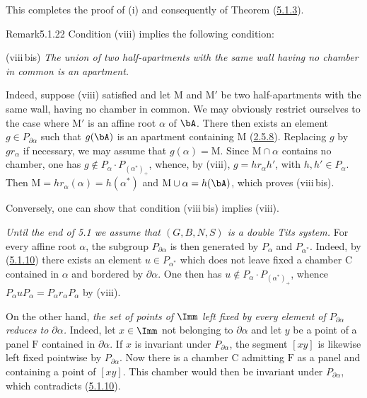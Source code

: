 \documentclass[12pt,a4paper,oneside,english]{smfart}
\makeatletter
\newcommand{\btanchor}[1]{\leavevmode\Hy@raisedlink{\hypertarget{bt:#1}{}}}
\newcommand{\btref}[1]{\hyperlink{bt:#1}{#1}}
\theoremstyle{definition}
\theoremstyle{bt}
\makeatother
\begin{document}
This completes the proof of (i) and consequently of Theorem (\btref{5.1.3}).

\begin{btstat}{Remark}{5.1.22}\btanchor{5.1.22}
\upshape
Condition (viii) implies the following condition:

\medskip
\noindent
(viii\,bis) \emph{The union of two half-apartments with the same wall having no
chamber in common is an apartment.}

\medskip
Indeed, suppose (viii) satisfied and let $\mathrm{M}$ and $\mathrm{M}'$ be two
half-apartments with the same wall, having no chamber in common. We may
obviously restrict ourselves to the case where $\mathrm{M}'$ is an affine root
$\alpha$ of $\bA$. There then exists an element $g\in P_{\partial\alpha}$ such
that $g(\bA)$ is an apartment containing $\mathrm{M}$ (\btref{2.5.8}). Replacing $g$ by
$gr_{\alpha}$ if necessary, we may assume that $g(\alpha)=\mathrm{M}$. Since
$\mathrm{M}\cap\alpha$ contains no chamber, one has
$g\notin P_{\alpha}\cdot P_{(\alpha^{*})_{+}}$, whence, by (viii),
$g=hr_{\alpha}h'$, with $h,h'\in P_{\alpha}$. Then
$\mathrm{M}=hr_{\alpha}(\alpha)=h(\alpha^{*})$ and
$\mathrm{M}\cup\alpha=h(\bA)$, which proves (viii\,bis).

Conversely, one can show that condition (viii\,bis) implies (viii).
\end{btstat}

\btanchor{5.1.23}
\emph{Until the end of \textup{5.1} we assume that $(G,B,N,S)$ is a double Tits
system.} For every affine root $\alpha$, the subgroup $P_{\partial\alpha}$ is
then generated by $P_{\alpha}$ and $P_{\alpha^{*}}$. Indeed, by (\btref{5.1.10}) there
exists an element $u\in P_{\alpha^{*}}$ which does not leave fixed a chamber
$\mathrm{C}$ contained in $\alpha$ and bordered by $\partial\alpha$. One then
has $u\notin P_{\alpha}\cdot P_{(\alpha^{*})_{+}}$, whence
$P_{\alpha}uP_{\alpha}=P_{\alpha}r_{\alpha}P_{\alpha}$ by (viii).

On the other hand, \emph{the set of points of $\Imm$ left fixed by every element
of $P_{\partial\alpha}$ reduces to $\partial\alpha$.} Indeed, let
$x\in\Imm$ not belonging to $\partial\alpha$ and let $y$ be a point of a panel
$\mathrm{F}$ contained in $\partial\alpha$. If $x$ is invariant under
$P_{\partial\alpha}$, the segment $[xy]$ is likewise left fixed pointwise by
$P_{\partial\alpha}$. Now there is a chamber $\mathrm{C}$ admitting $\mathrm{F}$
as a panel and containing a point of $[xy]$. This chamber would then be
invariant under $P_{\partial\alpha}$, which contradicts (\btref{5.1.10}).
\end{document}
